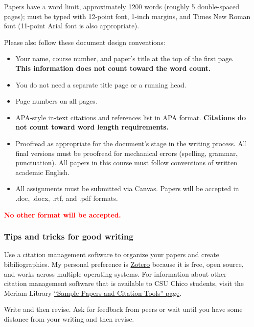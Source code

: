 \documentclass[11pt,]{article}
\providecommand{\tightlist}{%
  \setlength{\itemsep}{0pt}\setlength{\parskip}{0pt}}
\begin{document}
Papers have a word limit, approximately 1200 words (roughly 5
double-spaced pages); must be typed with 12-point font, 1-inch margins,
and Times New Roman font (11-point Arial font is also appropriate).

Please also follow these document design conventions:

\begin{itemize}
\tightlist
\item
  Your name, course number, and paper's title at the top of the first
  page. \textbf{This information does not count toward the word count.}
\item
  You do not need a separate title page or a running head.
\item
  Page numbers on all pages.
\item
  APA-style in-text citations and references list in APA format.
  \textbf{Citations do not count toward word length requirements.}
\item
  Proofread as appropriate for the document's stage in the writing
  process. All final versions must be proofread for mechanical errors
  (spelling, grammar, punctuation). All papers in this course must
  follow conventions of written academic English.
\item
  All assignments must be submitted via Canvas. Papers will be accepted
  in .doc, .docx, .rtf, and .pdf formats.
\end{itemize}

\textcolor{red}{\bf{No other format will be accepted.}}

\hypertarget{tips-and-tricks-for-good-writing}{%
\subsubsection{Tips and tricks for good
writing}\label{tips-and-tricks-for-good-writing}}

Use a citation management software to organize your papers and create
bibiliographies. My personal preference is
\href{https://www.zotero.org/}{Zotero} because it is free, open source,
and works across multiple operating systems. For information about other
citation management software that is available to CSU Chico students,
visit the Meriam Library
\href{https://libguides.csuchico.edu/c.php?g=432300\&p=2948649}{``Sample
Papers and Citation Tools'' page}.

Write and then revise. Ask for feedback from peers or wait until you
have some distance from your writing and then revise.
\end{document}
